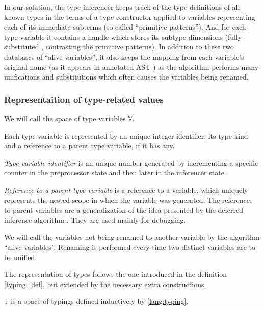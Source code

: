 In our solution, the type inferencer keeps track of the type definitions of all known types in the terms of a type constructor applied to variables representing each of its immediate subterms (so called ``primitive patterns''). And for each type variable it contains a handle which stores its subtype dimensions (fully substituted , contrasting the primitive patterns). In addition to these two databases of ``alive variables'', it also keeps the mapping from each variable's original name (as it appears in annotated AST ) as the algorithm performs many unifications and substitutions which often causes the variables being renamed.

\subsubsection{Representaition of type-related values}

\begin{defn}
    We will call the space of type variables $\mathbb{V}$.

    Each type variable is represented by an unique integer identifier, its type kind and a reference to a parent type variable, if it has any.

    \emph{Type variable identifier} is an unique number generated by incrementing a specific counter in the preprocessor state  and then later in the inferencer state.

    \emph{Reference to a parent type variable} is a reference to a variable, which uniquely represents the nested scope in which the variable was generated. The references to parent variables are a generalization of the idea presented by the deferred inference algorithm  . They are used mainly for debugging.
\end{defn}

\begin{defn}
    We will call the variables not being renamed to another variable by the algorithm ``alive variables''. Renaming is performed every time two distinct variables are to be unified.
\end{defn}

The representation of types follows the one introduced in the definition \ref{typing_def}, but extended by the necessary extra constructions.

\begin{defn}[Typings]
    \label{typing_gram}
    $\mathbb{T}$ is a space of typings defined inductively by \cref{lang:typing}.
\end{defn}

